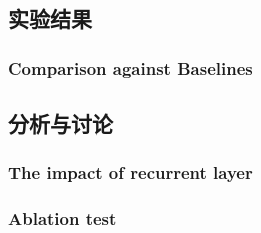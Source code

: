 \subsection{实验结果}

\subsubsection{Comparison against Baselines}

\subsection{分析与讨论}

\subsubsection{The impact of recurrent layer}

\subsubsection{Ablation test}

